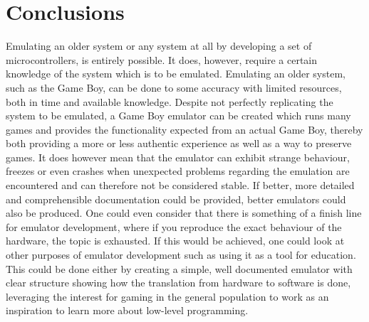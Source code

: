 \chapter{Conclusions}
Emulating an older system or any system at all by developing a set of microcontrollers, is entirely possible. It does, however, require a certain knowledge of the system which is to be emulated. Emulating an older system, such as the Game Boy, can be done to some accuracy with limited resources, both in time and available knowledge. Despite not perfectly replicating the system to be emulated, a Game Boy emulator can be created which runs many games and provides the functionality expected from an actual Game Boy, thereby both providing a more or less authentic experience as well as a way to preserve games. It does however mean that the emulator can exhibit strange behaviour, freezes or even crashes when unexpected problems regarding the emulation are encountered and can therefore not be considered stable. If better, more detailed and comprehensible documentation could be provided, better emulators could also be produced. One could even consider that there is something of a finish line for emulator development, where if you reproduce the exact behaviour of the hardware, the topic is exhausted. If this would be achieved, one could look at other purposes of emulator development such as using it as a tool for education. This could be done either by creating a simple, well documented emulator with clear structure showing how the translation from hardware to software is done, leveraging the interest for gaming in the general population to work as an inspiration to learn more about low-level programming.
